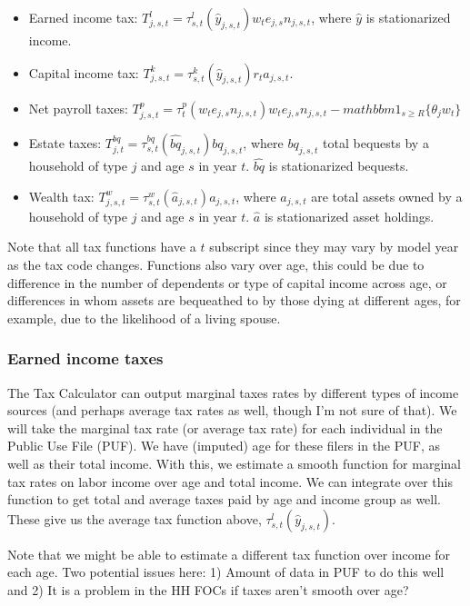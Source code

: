 \documentclass[letterpaper,12pt]{article}
\theoremstyle{definition}
\begin{document}
\begin{spacing}{1.5}
\begin{itemize}
\item Earned income tax:  $T^{l}_{j,s,t}  = \tau^{l}_{s,t}(\hat{y}_{j,s,t})w_t e_{j,s}n_{j,s,t}$, where $\hat{y}$ is stationarized income.
\item Capital income tax: $T^k_{j,s,t}  = \tau^{k}_{s,t}(\hat{y}_{j,s,t})r_{t}a_{j,s,t}$.
\item Net payroll taxes: $T^p_{j,s,t}  = \tau^{p}_{t}(w_t e_{j,s}n_{j,s,t})w_t e_{j,s}n_{j,s,t} - mathbbm{1}_{s\geq R}\{\theta_j w_t\}$
\item Estate taxes: $T^{bq}_{j,t}  =\tau^{bq}_{s,t}(\hat{bq}_{j,s,t})bq_{j,s,t}$, where $bq_{j,s,t}$ total bequests by a household of type $j$ and age $s$ in year $t$.  $\hat{bq}$ is stationarized bequests.
\item Wealth tax: $T^w_{j,s,t} = \tau^{w}_{s,t}(\hat a_{j,s,t}) a_{j,s,t}$, where $a_{j,s,t}$ are total assets owned by a household of type $j$ and age $s$ in year $t$.  $\hat{a}$ is stationarized asset holdings. 
\end{itemize}
Note that all tax functions have a $t$ subscript since they may vary by model year as the tax code changes.  Functions also vary over age, this could be due to difference in the number of dependents or type of capital income across age, or differences in whom assets are bequeathed to by those dying at different ages, for example, due to the likelihood of a living spouse.

\subsubsection{Earned income taxes}
The Tax Calculator can output marginal taxes rates by different types of income sources (and perhaps average tax rates as well, though I'm not sure of that).  We will take the marginal tax rate (or average tax rate) for each individual in the Public Use File (PUF).  We have (imputed) age for these filers in the PUF, as well as their total income.  With this, we estimate a smooth function for marginal tax rates on labor income over age and total income.  We can integrate over this function to get total and average taxes paid by age and income group as well.  These give us the average tax function above, $ \tau^{l}_{s,t}(\hat{y}_{j,s,t})$.

Note that we might be able to estimate a different tax function over income for each age.  Two potential issues here: 1) Amount of data in PUF to do this well and 2) It is a problem in the HH FOCs if taxes aren't smooth over age?


\end{spacing}
\end{document}
